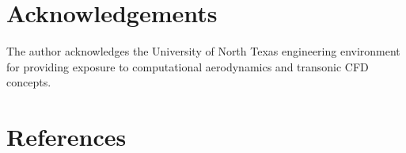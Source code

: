 \documentclass[10pt]{article}
\begin{document}

\section{Acknowledgements}

The author acknowledges the University of North Texas engineering
environment for providing exposure to computational aerodynamics and
transonic CFD concepts.


\section{References}
\end{document}
